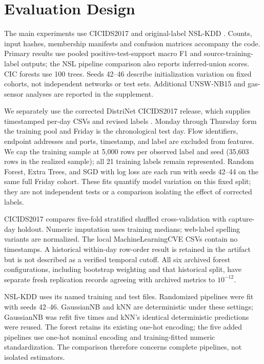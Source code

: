 \documentclass[namedate,webpdf,contemporary,large]{TBench-template}
\begin{document}
\section{Evaluation Design}
The main experiments use CICIDS2017 \cite{sharafaldin2018} and original-label NSL-KDD \cite{tavallaee2009}. Counts, input hashes, membership manifests and confusion matrices accompany the code. Primary results use pooled positive-test-support macro F1 and source-training-label outputs; the NSL pipeline comparison also reports inferred-union scores. CIC forests use 100 trees. Seeds 42--46 describe initialization variation on fixed cohorts, not independent networks or test sets. Additional UNSW-NB15 and gas-sensor analyses are reported in the supplement.

We separately use the corrected DistriNet CICIDS2017 release, which supplies timestamped per-day CSVs and revised labels \cite{engelen2021,lanvin2023}. Monday through Thursday form the training pool and Friday is the chronological test day. Flow identifiers, endpoint addresses and ports, timestamp, and label are excluded from features. We cap the training sample at 5,000 rows per observed label and seed (35,603 rows in the realized sample); all 21 training labels remain represented. Random Forest, Extra Trees, and SGD with log loss are each run with seeds 42--44 on the same full Friday cohort. These fits quantify model variation on this fixed split; they are not independent tests or a comparison isolating the effect of corrected labels.

CICIDS2017 compares five-fold stratified shuffled cross-validation with capture-day holdout. Numeric imputation uses training medians; web-label spelling variants are normalized. The local MachineLearningCVE CSVs contain no timestamps. A historical within-day row-order result is retained in the artifact but is not described as a verified temporal cutoff. All six archived forest configurations, including bootstrap weighting and that historical split, have separate fresh replication records agreeing with archived metrics to \(10^{-12}\).

NSL-KDD uses its named training and test files. Randomized pipelines were fit with seeds 42--46. GaussianNB and kNN are deterministic under these settings; GaussianNB was refit five times and kNN's identical deterministic predictions were reused. The forest retains its existing one-hot encoding; the five added pipelines use one-hot nominal encoding and training-fitted numeric standardization. The comparison therefore concerns complete pipelines, not isolated estimators.
\end{document}
